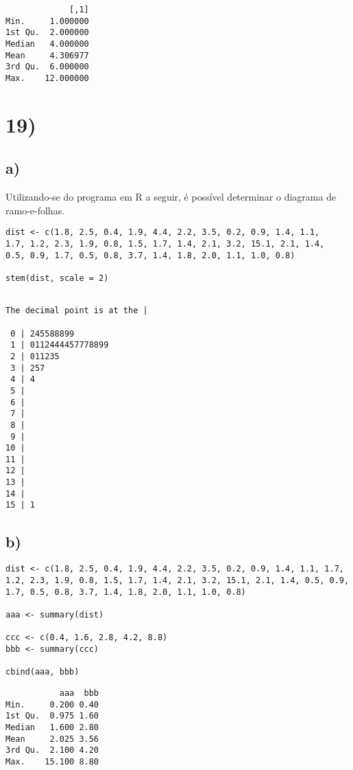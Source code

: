 \documentclass[11pt]{article}
\begin{document}
\begin{verbatim}
             [,1]
Min.     1.000000
1st Qu.  2.000000
Median   4.000000
Mean     4.306977
3rd Qu.  6.000000
Max.    12.000000
\end{verbatim}

\section*{19)}
\label{sec:org54e9e87}

\subsection*{a)}
\label{sec:orgcbf22d6}

Utilizando-se do programa em R a seguir, é possível determinar o
diagrama de ramo-e-folhas.

\begin{verbatim}
dist <- c(1.8, 2.5, 0.4, 1.9, 4.4, 2.2, 3.5, 0.2, 0.9, 1.4, 1.1,
1.7, 1.2, 2.3, 1.9, 0.8, 1.5, 1.7, 1.4, 2.1, 3.2, 15.1, 2.1, 1.4,
0.5, 0.9, 1.7, 0.5, 0.8, 3.7, 1.4, 1.8, 2.0, 1.1, 1.0, 0.8)

stem(dist, scale = 2)
\end{verbatim}

\begin{verbatim}

The decimal point is at the |

 0 | 245588899
 1 | 0112444457778899
 2 | 011235
 3 | 257
 4 | 4
 5 | 
 6 | 
 7 | 
 8 | 
 9 | 
10 | 
11 | 
12 | 
13 | 
14 | 
15 | 1

\end{verbatim}

\subsection*{b)}
\label{sec:org22f5809}

\begin{verbatim}
dist <- c(1.8, 2.5, 0.4, 1.9, 4.4, 2.2, 3.5, 0.2, 0.9, 1.4, 1.1, 1.7, 1.2, 2.3, 1.9, 0.8, 1.5, 1.7, 1.4, 2.1, 3.2, 15.1, 2.1, 1.4, 0.5, 0.9, 1.7, 0.5, 0.8, 3.7, 1.4, 1.8, 2.0, 1.1, 1.0, 0.8)

aaa <- summary(dist)

ccc <- c(0.4, 1.6, 2.8, 4.2, 8.8)
bbb <- summary(ccc)

cbind(aaa, bbb)
\end{verbatim}

\begin{verbatim}
           aaa  bbb
Min.     0.200 0.40
1st Qu.  0.975 1.60
Median   1.600 2.80
Mean     2.025 3.56
3rd Qu.  2.100 4.20
Max.    15.100 8.80
\end{verbatim}
\end{document}
